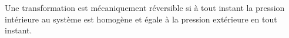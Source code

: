 ﻿\documentclass[a4paper]{article}
\begin{document}
\pagestyle{fancy}
\fancyhf{}
\setlength{\headheight}{15pt}

\begin{center}
	\large{}
\end{center}


Une transformation est mécaniquement réversible si à tout instant la pression intérieure au système est homogène et égale à la pression extérieure en tout instant.
\end{document}
